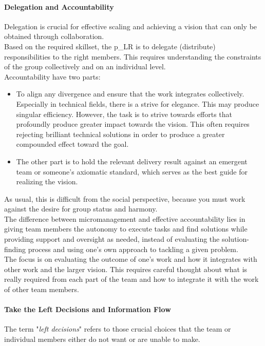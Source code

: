 \paragraph{Delegation and Accountability}
Delegation is crucial for effective scaling and achieving a vision that can only be obtained through collaboration.\\

Based on the required skillset, the \gls{p_LR} is to delegate (distribute) responsibilities to the right members. This requires understanding the constraints of the group collectively and on an individual level.\\

Accountability have two parts: 
\begin{itemize}
    \item To align any divergence and ensure that the work integrates collectively. Especially in technical fields, there is a strive for elegance. This may produce singular efficiency. However, the task is to strive towards efforts that profoundly produce greater impact towards the vision. This often requires rejecting brilliant technical solutions in order to produce a greater compounded effect toward the goal.
    \item The other part is to hold the relevant delivery result against an emergent team or someone's axiomatic standard, which serves as the best guide for realizing the vision.
\end{itemize}

As usual, this is difficult from the social perspective, because you must work against the desire for group status and harmony.\\

The difference between micromanagement and effective accountability lies in giving team members the autonomy to execute tasks and find solutions while providing support and oversight as needed, instead of evaluating the solution-finding process and using one's own approach to tackling a given problem.\\

The focus is on evaluating the outcome of one's work and how it integrates with other work and the larger vision. This requires careful thought about what is really required from each part of the team and how to integrate it with the work of other team members.

\paragraph{Take the Left Decisions and Information Flow}
The term "\textit{left decisions}" refers to those crucial choices that the team or individual members either do not want or are unable to make.

